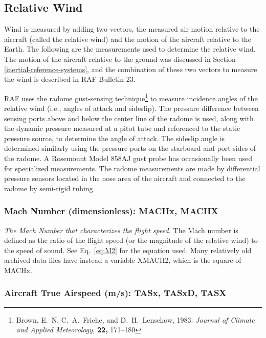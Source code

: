 \documentclass[
]{book}
\begin{document}
\hypertarget{relative-wind}{%
\subsection{Relative Wind}\label{relative-wind}}

Wind is measured by adding two vectors, the measured air motion relative to the aircraft (called the relative wind) and the motion of the aircraft relative to the Earth. The following are the measurements used to determine the relative wind. The motion of the aircraft relative to the ground was discussed in Section \ref{inertial-reference-systems}, and the combination of these two vectors to measure the wind is described in RAF Bulletin 23.

RAF uses the radome\protect\hypertarget{radomeux20gust-sensingux20system}{}{} gust-sensing technique\footnote{Brown, E.~N, C.~A.~Friehe, and D.~H.~Lenschow, 1983: \emph{Journal of Climate and Applied Meteorology,} \textbf{22,} 171--180}
to measure incidence angles of the relative wind (i.e., angles of attack and sideslip). The pressure difference between sensing ports above and below the center line of the radome is used, along with the dynamic pressure measured at a pitot tube and referenced to the static pressure source, to determine the angle of attack. The sideslip angle is determined similarly using the pressure ports on the starboard and port sides of the radome. A Rosemount Model 858AJ gust probe has occasionally been used for specialized measurements. The radome measurements are made by differential pressure sensors located in the nose area of the aircraft and connected to the radome by semi-rigid tubing.

\hypertarget{mach-number}{%
\subsubsection*{Mach Number (dimensionless): MACHx, MACHX}\label{mach-number}}

\emph{The Mach Number that characterizes the flight speed.} The Mach number is defined as the ratio of the flight speed (or the magnitude of the relative wind) to the speed of sound.
See Eq.~\eqref{eq:M2} for the equation used. Many relatively old archived data files have instead a variable XMACH2, which is the square of MACHx.

\hypertarget{true-airspeed}{%
\subsubsection*{Aircraft True Airspeed (m/s): TASx, TASxD, TASX}\label{true-airspeed}}
\end{document}
